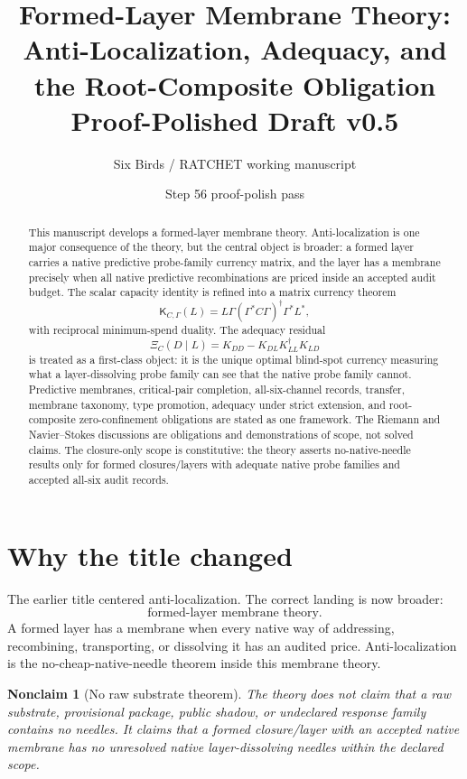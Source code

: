 \documentclass[11pt]{article}
\title{Formed-Layer Membrane Theory:\\
Anti-Localization, Adequacy, and the Root-Composite Obligation\\
\large Proof-Polished Draft v0.5}
\author{Six Birds / RATCHET working manuscript}
\date{Step 56 proof-polish pass}
\newtheorem{nonclaim}[theorem]{Nonclaim}
\newcommand{\K}{\mathsf K}
\begin{document}
\maketitle

\begin{abstract}
This manuscript develops a formed-layer membrane theory.  Anti-localization is one major consequence of the theory, but the central object is broader: a formed layer carries a native predictive probe-family currency matrix, and the layer has a membrane precisely when all native predictive recombinations are priced inside an accepted audit budget.  The scalar capacity identity is refined into a matrix currency theorem
\[
  \K_{C,\Gamma}(L)=L\Gamma(\Gamma^*C\Gamma)^\dagger\Gamma^*L^*,
\]
with reciprocal minimum-spend duality.  The adequacy residual
\[
  \Xi_C(D\mid L)=K_{DD}-K_{DL}K_{LL}^\dagger K_{LD}
\]
is treated as a first-class object: it is the unique optimal blind-spot currency measuring what a layer-dissolving probe family can see that the native probe family cannot.  Predictive membranes, critical-pair completion, all-six-channel records, transfer, membrane taxonomy, type promotion, adequacy under strict extension, and root-composite zero-confinement obligations are stated as one framework.  The Riemann and Navier--Stokes discussions are obligations and demonstrations of scope, not solved claims.  The closure-only scope is constitutive: the theory asserts no-native-needle results only for formed closures/layers with adequate native probe families and accepted all-six audit records.
\end{abstract}

\tableofcontents

\section{Why the title changed}

The earlier title centered anti-localization.  The correct landing is now broader:
\[
\boxed{\text{formed-layer membrane theory.}}
\]
A formed layer has a membrane when every native way of addressing, recombining, transporting, or dissolving it has an audited price.  Anti-localization is the no-cheap-native-needle theorem inside this membrane theory.

\begin{nonclaim}[No raw substrate theorem]
The theory does not claim that a raw substrate, provisional package, public shadow, or undeclared response family contains no needles.  It claims that a formed closure/layer with an accepted native membrane has no unresolved native layer-dissolving needles within the declared scope.
\end{nonclaim}
\end{document}
